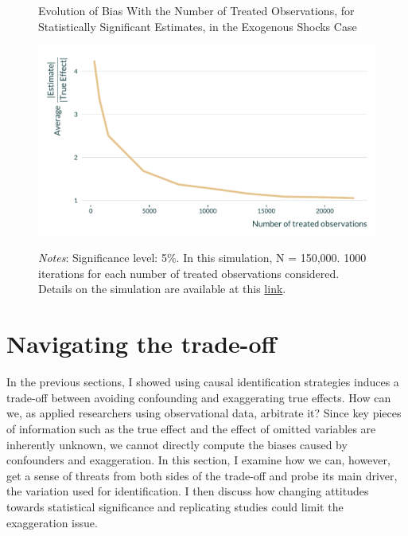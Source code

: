 \documentclass[usletter, 12pt]{article}
\begin{document}
			\begin{figure}[!h] 
                    			\begin{center}
                    				\caption{Evolution of Bias With the Number of Treated Observations, for Statistically Significant Estimates, in the Exogenous Shocks Case}
                    				\label{graph_shocks}
                    				\includegraphics[width=0.8\linewidth]{images/main_graph_DID_paper.pdf}
                                    \caption*{\footnotesize \textit{Notes}: Significance level: 5\%. In this simulation, N = 150,000. 1000 iterations for each number of treated observations considered. Details on the simulation are available at this \href{https://vincentbagilet.github.io/causal_exaggeration/shocks.html}{link}.}
                                    \end{center}
				\vspace{-1cm}
                    		\end{figure} 
		
		



	\section{Navigating the trade-off} \label{discussion}

 		In the previous sections, I showed using causal identification strategies induces a trade-off between avoiding confounding and exaggerating true effects. How can we, as applied researchers using observational data, arbitrate it? Since key pieces of information such as the true effect and the effect of omitted variables are inherently unknown, we cannot directly compute the biases caused by confounders and exaggeration. In this section, I examine how we can, however, get a sense of threats from both sides of the trade-off and probe its main driver, the variation used for identification. I then discuss how changing attitudes towards statistical significance and replicating studies could limit the exaggeration issue.
	
\end{document}
